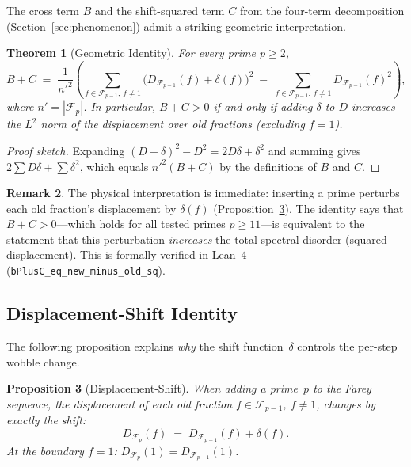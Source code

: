\documentclass[11pt]{article}
\newtheorem{theorem}{Theorem}[section]
\newtheorem{proposition}[theorem]{Proposition}
\theoremstyle{definition}
\newtheorem{remark}[theorem]{Remark}
\newcommand{\F}{\mathcal{F}}
\begin{document}
The cross term $B$ and the shift-squared term $C$ from the
four-term decomposition (Section~\ref{sec:phenomenon}) admit a
striking geometric interpretation.

\begin{theorem}[Geometric Identity]\label{thm:geometric-bc}
For every prime $p \ge 2$,
\begin{equation}\label{eq:geometric-bc}
  B + C \;=\; \frac{1}{{n'}^2}\!\left(
    \sum_{f \in \F_{p-1},\, f \ne 1}
      \bigl(D_{\F_{p-1}}(f) + \delta(f)\bigr)^2
    \;-\; \sum_{f \in \F_{p-1},\, f \ne 1} D_{\F_{p-1}}(f)^2
  \right),
\end{equation}
where $n' = |\F_p|$.  In particular,
$B + C > 0$ if and only if adding $\delta$ to $D$ increases
the $L^2$ norm of the displacement over old fractions
(excluding $f = 1$).
\end{theorem}

\begin{proof}[Proof sketch]
Expanding $(D + \delta)^2 - D^2 = 2D\delta + \delta^2$ and
summing gives $2\sum D\delta + \sum \delta^2$, which equals
$n'^2(B + C)$ by the definitions of $B$ and $C$.
\end{proof}

\begin{remark}
The physical interpretation is immediate: inserting a prime
perturbs each old fraction's displacement by $\delta(f)$
(Proposition~\ref{prop:disp-shift}).  The identity says that
$B + C > 0$---which holds for all tested primes $p \ge 11$---is
equivalent to the statement that this perturbation \emph{increases}
the total spectral disorder (squared displacement).  This is
formally verified in Lean~4 (\texttt{bPlusC\_eq\_new\_minus\_old\_sq}).
\end{remark}

\subsection{Displacement-Shift Identity}

The following proposition explains \emph{why} the shift
function~$\delta$ controls the per-step wobble change.

\begin{proposition}[Displacement-Shift]\label{prop:disp-shift}
When adding a prime~$p$ to the Farey sequence, the displacement
of each old fraction $f \in \F_{p-1}$, $f \ne 1$, changes by
exactly the shift:
\begin{equation}\label{eq:disp-shift}
  D_{\F_p}(f) \;=\; D_{\F_{p-1}}(f) + \delta(f).
\end{equation}
At the boundary $f = 1$: $D_{\F_p}(1) = D_{\F_{p-1}}(1)$.
\end{proposition}
\end{document}
